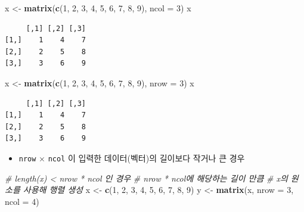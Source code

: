 \documentclass[
  11pt,
]{krantz}
\newenvironment{Shaded}{\begin{snugshade}}{\end{snugshade}}
\newcommand{\CommentTok}[1]{\textcolor[rgb]{0.37,0.37,0.37}{\textit{#1}}}
\newcommand{\DataTypeTok}[1]{\textcolor[rgb]{0.27,0.27,0.27}{#1}}
\newcommand{\DecValTok}[1]{\textcolor[rgb]{0.06,0.06,0.06}{#1}}
\newcommand{\KeywordTok}[1]{\textcolor[rgb]{0.27,0.27,0.27}{\textbf{#1}}}
\newcommand{\NormalTok}[1]{#1}
\newcommand{\StringTok}[1]{\textcolor[rgb]{0.5,0.5,0.5}{#1}}
\providecommand{\tightlist}{%
  \setlength{\itemsep}{0pt}\setlength{\parskip}{0pt}}
\begin{document}
\footnotesize

\begin{Shaded}
\begin{Highlighting}[]
\NormalTok{x <-}\StringTok{ }\KeywordTok{matrix}\NormalTok{(}\KeywordTok{c}\NormalTok{(}\DecValTok{1}\NormalTok{, }\DecValTok{2}\NormalTok{, }\DecValTok{3}\NormalTok{, }\DecValTok{4}\NormalTok{, }\DecValTok{5}\NormalTok{, }\DecValTok{6}\NormalTok{, }\DecValTok{7}\NormalTok{, }\DecValTok{8}\NormalTok{, }\DecValTok{9}\NormalTok{), }\DataTypeTok{ncol =} \DecValTok{3}\NormalTok{)}
\NormalTok{x}
\end{Highlighting}
\end{Shaded}

\begin{verbatim}
     [,1] [,2] [,3]
[1,]    1    4    7
[2,]    2    5    8
[3,]    3    6    9
\end{verbatim}

\begin{Shaded}
\begin{Highlighting}[]
\NormalTok{x <-}\StringTok{ }\KeywordTok{matrix}\NormalTok{(}\KeywordTok{c}\NormalTok{(}\DecValTok{1}\NormalTok{, }\DecValTok{2}\NormalTok{, }\DecValTok{3}\NormalTok{, }\DecValTok{4}\NormalTok{, }\DecValTok{5}\NormalTok{, }\DecValTok{6}\NormalTok{, }\DecValTok{7}\NormalTok{, }\DecValTok{8}\NormalTok{, }\DecValTok{9}\NormalTok{), }\DataTypeTok{nrow =} \DecValTok{3}\NormalTok{)}
\NormalTok{x}
\end{Highlighting}
\end{Shaded}

\begin{verbatim}
     [,1] [,2] [,3]
[1,]    1    4    7
[2,]    2    5    8
[3,]    3    6    9
\end{verbatim}

\normalsize

\begin{itemize}
\tightlist
\item
  \texttt{nrow} \(\times\) \texttt{ncol} 이 입력한 데이터(벡터)의 길이보다 작거나 큰 경우
\end{itemize}

\footnotesize

\begin{Shaded}
\begin{Highlighting}[]
\CommentTok{# length(x) < nrow * ncol 인 경우 }
\CommentTok{# nrow * ncol에 해당하는 길이 만큼}
\CommentTok{# x의 원소를 사용해 행렬 생성}
\NormalTok{x <-}\StringTok{ }\KeywordTok{c}\NormalTok{(}\DecValTok{1}\NormalTok{, }\DecValTok{2}\NormalTok{, }\DecValTok{3}\NormalTok{, }\DecValTok{4}\NormalTok{, }\DecValTok{5}\NormalTok{, }\DecValTok{6}\NormalTok{, }\DecValTok{7}\NormalTok{, }\DecValTok{8}\NormalTok{, }\DecValTok{9}\NormalTok{)}
\NormalTok{y <-}\StringTok{ }\KeywordTok{matrix}\NormalTok{(x, }\DataTypeTok{nrow =} \DecValTok{3}\NormalTok{, }\DataTypeTok{ncol =} \DecValTok{4}\NormalTok{)}
\end{Highlighting}
\end{Shaded}
\end{document}
